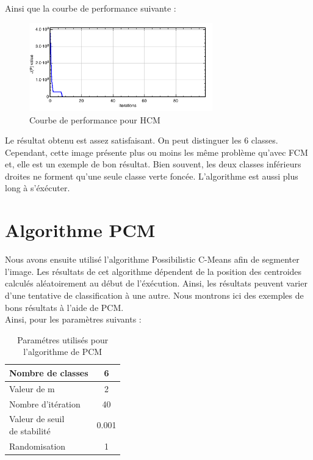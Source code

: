 \documentclass[a4paper,11pt]{article}
\begin{document}
Ainsi que la courbe de performance suivante :

\begin{figure}[H]
\begin{center}
\includegraphics[width=300px]{../img/Perf_HCM.png}
\end{center}
\caption{Courbe de performance pour HCM}
\end{figure}

Le résultat obtenu est assez satisfaisant. On peut distinguer les 6 classes. Cependant, cette image présente plus ou moins les même problème qu'avec FCM et, elle est un exemple de bon résultat. Bien souvent, les deux classes inférieurs droites ne forment qu'une seule classe verte foncée. L'algorithme est aussi plus long à s'éxécuter. 

\section{Algorithme PCM}
Nous avons ensuite utilisé l'algorithme Possibilistic C-Means afin de segmenter l'image. Les résultats de cet algorithme dépendent de la position des centroides calculés aléatoirement au début de l'éxécution. Ainsi, les résultats peuvent varier d'une tentative de classification à une autre. Nous montrons ici des exemples de bons résultats à l'aide de PCM. \\

Ainsi, pour les paramètres suivants : 

\begin{table}[H]
  \begin{center}
    \begin{tabular}{|l|c|}
      \hline
      Nombre de classes & 6 \\
      \hline
      Valeur de m & 2 \\
      \hline
      Nombre d'itération & 40 \\
      \hline
      \shortstack{ Valeur de seuil \\ de stabilité }  & 0.001 \\
      \hline
      Randomisation & 1 \\
      \hline
    \end{tabular}
    \caption{Paramétres utilisés pour l'algorithme de PCM}
  \end{center}
\end{table}
\end{document}
